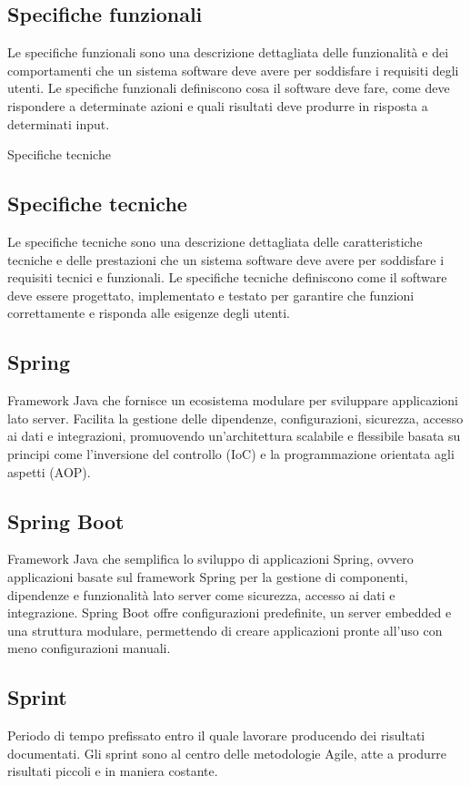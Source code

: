 \subsection*{Specifiche funzionali}
Le specifiche funzionali sono una descrizione dettagliata delle funzionalità e dei comportamenti che un sistema software deve avere per soddisfare i 
requisiti degli utenti. Le specifiche funzionali definiscono cosa il software deve fare, come deve rispondere a determinate azioni e quali risultati
deve produrre in risposta a determinati input.

\hypertarget{sec:specifiche_tecniche}{Specifiche tecniche}
\subsection*{Specifiche tecniche}
Le specifiche tecniche sono una descrizione dettagliata delle caratteristiche tecniche e delle prestazioni che un sistema software deve avere per
soddisfare i requisiti tecnici e funzionali. Le specifiche tecniche definiscono come il software deve essere progettato, implementato e testato per
garantire che funzioni correttamente e risponda alle esigenze degli utenti.

\hypertarget{sec:spring}{}
\subsection*{Spring}
Framework Java che fornisce un ecosistema modulare per sviluppare applicazioni lato server. Facilita la gestione delle dipendenze, configurazioni, 
sicurezza, accesso ai dati e integrazioni, promuovendo un'architettura scalabile e flessibile basata su principi come l'inversione del controllo (IoC) e 
la programmazione orientata agli aspetti (AOP).

\hypertarget{sec:spring_boot}{}
\subsection*{Spring Boot}
Framework Java che semplifica lo sviluppo di applicazioni Spring, ovvero applicazioni basate sul framework Spring per la gestione di componenti, dipendenze 
e funzionalità lato server come sicurezza, accesso ai dati e integrazione. Spring Boot offre configurazioni predefinite, un server embedded e una struttura 
modulare, permettendo di creare applicazioni pronte all'uso con meno configurazioni manuali.

\subsection*{Sprint}
Periodo di tempo prefissato entro il quale lavorare producendo dei risultati documentati. Gli sprint sono al centro delle metodologie Agile, atte a produrre 
risultati piccoli e in maniera costante.

